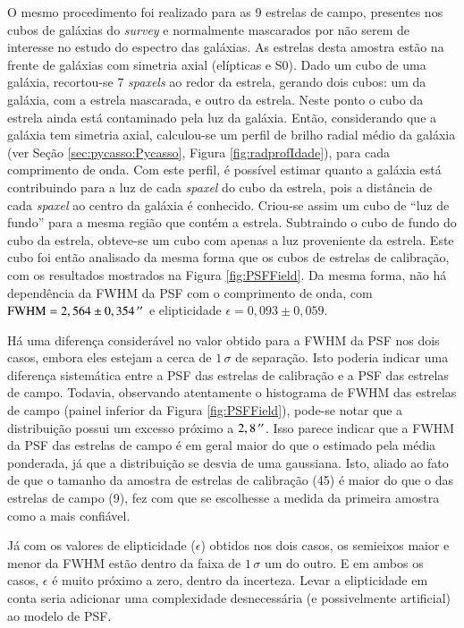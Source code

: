O mesmo procedimento foi realizado para as 9 estrelas de campo, presentes nos
cubos de galáxias do {\em survey} e normalmente mascarados por não serem de
interesse no estudo do espectro das galáxias. As estrelas desta amostra estão na
frente de galáxias com simetria axial (elípticas e S0). Dado um cubo de uma
galáxia, recortou-se 7 {\em spaxels} ao redor da estrela, gerando dois cubos: um
da galáxia, com a estrela mascarada, e outro da estrela. Neste ponto o cubo da
estrela ainda está contaminado pela luz da galáxia. Então, considerando que a
galáxia tem simetria axial, calculou-se um perfil de brilho radial médio da
galáxia (ver Seção \ref{sec:pycasso:Pycasso}, Figura \ref{fig:radprofIdade}),
para cada comprimento de onda. Com este perfil, é possível estimar quanto a
galáxia está contribuindo para a luz de cada {\em spaxel} do cubo da estrela,
pois a distância de cada {\em spaxel} ao centro da galáxia é conhecido. Criou-se
assim um cubo de ``luz de fundo'' para a mesma região que contém a estrela.
Subtraindo o cubo de fundo do cubo da estrela, obteve-se um cubo com apenas a
luz proveniente da estrela. Este cubo foi então analisado da mesma forma que os
cubos de estrelas de calibração, com os resultados mostrados na Figura
\ref{fig:PSFField}. Da mesma forma, não há dependência da FWHM da PSF com o
comprimento de onda, com $\mathrm{FWHM}=2,564 \pm 0,354\,^{\prime\prime}$ e elipticidade
$\epsilon=0,093 \pm 0,059$.

Há uma diferença considerável no valor obtido para a FWHM da PSF nos dois casos,
embora eles estejam a cerca de $1\,\sigma$ de separação. Isto poderia indicar
uma diferença sistemática entre a PSF das estrelas de calibração e a PSF das
estrelas de campo. Todavia, observando atentamente o histograma de FWHM das
estrelas de campo (painel inferior da Figura \ref{fig:PSFField}), pode-se notar
que a distribuição possui um excesso próximo a $2,8\,^{\prime\prime}$. Isso parece indicar
que a FWHM da PSF das estrelas de campo é em geral maior do que o estimado pela
média ponderada, já que a distribuição se desvia de uma gaussiana. Isto, aliado
ao fato de que o tamanho da amostra de estrelas de calibração (45) é maior do
que o das estrelas de campo (9), fez com que se escolhesse a medida da primeira
amostra como a mais confiável.

Já com os valores de elipticidade ($\epsilon$) obtidos nos dois casos, os
semieixos maior e menor da FWHM estão dentro da faixa de $1\,\sigma$ um do
outro. E em ambos os casos, $\epsilon$ é muito próximo a zero, dentro da
incerteza. Levar a elipticidade em conta seria adicionar uma complexidade
desnecessária (e possivelmente artificial) ao modelo de PSF.


